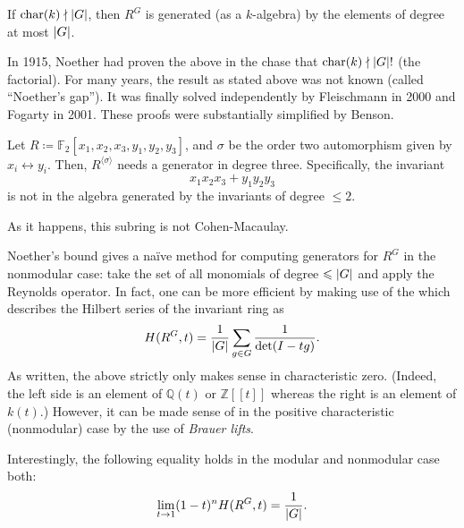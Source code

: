 \documentclass[12pt]{article}
\begin{document}
\begin{thm}
	If $\operatorname{char}(k) \nmid {\left\lvert G \right\lvert}$, then $R^{G}$ is generated (as a $k$-algebra) by the elements of degree at most ${\left\lvert G \right\lvert}$.
\end{thm}
In 1915, Noether had proven the above in the chase that $\operatorname{char}(k) \nmid {\left\lvert G \right\lvert}!$ (the factorial). For many years, the result as stated above was not known (called ``Noether's gap''). It was finally solved independently by Fleischmann in 2000 and Fogarty in 2001. These proofs were substantially simplified by Benson. 

\begin{ex} \phantom{h} \newline
	Let $R \coloneqq \mathbb{F}_{2}[x_{1}, x_{2}, x_{3}, y_{1}, y_{2}, y_{3}]$, and $\sigma$ be the order two automorphism given by $x_{i} \leftrightarrow y_{i}$. \newline
	Then, $R^{\langle \sigma \rangle}$ needs a generator in degree three. Specifically, the invariant
	\begin{equation*} 
		x_{1} x_{2} x_{3} + y_{1} y_{2} y_{3}
	\end{equation*}
	is not in the algebra generated by the invariants of degree $\le 2$. 

	As it happens, this subring is not Cohen-Macaulay.
\end{ex}

Noether's bound gives a na\"ive method for computing generators for $R^{G}$ in the nonmodular case: take the set of all monomials of degree $\leqslant {\left\lvert G \right\lvert}$ and apply the Reynolds operator. \newline
In fact, one can be more efficient by making use of the  which describes the Hilbert series of the invariant ring as
\begin{equation*} 
	H(R^{G}, t) = \frac{1}{{\left\lvert G \right\lvert}} \sum_{g \in G} \dfrac{1}{\det(I - tg)}.
\end{equation*}
As written, the above strictly only makes sense in characteristic zero. (Indeed, the left side is an element of $\mathbb{Q}(t)$ or $\mathbb{Z}[\![t]\!]$ whereas the right is an element of $k(t)$.) However, it can be made sense of in the positive characteristic (nonmodular) case by the use of \emph{Brauer lifts}.

Interestingly, the following equality holds in the modular and nonmodular case both:
\begin{equation*} 
	\lim_{t \to 1} (1 - t)^{n} H(R^{G}, t) = \frac{1}{{\left\lvert G \right\lvert}}.
\end{equation*}
\end{document}
